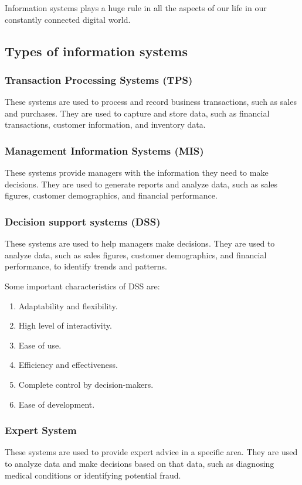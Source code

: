 \documentclass[twocolumn, 12pt, a4paper]{article}
\begin{document}
Information systems plays a huge rule in all the aspects of our life in our
constantly connected digital world.

\subsection{Types of information systems}
\subsubsection{Transaction Processing Systems (TPS)}
These systems are used to process and record business transactions, such as
sales and purchases. They are used to capture and store data, such as financial
transactions, customer information, and inventory data.

\subsubsection{Management Information Systems (MIS)}
These systems provide managers with the information they need to make
decisions. They are used to generate reports and analyze data, such as sales
figures, customer demographics, and financial performance.

\subsubsection{Decision support systems (DSS)}
These systems are used to help managers make decisions. They are used to
analyze data, such as sales figures, customer demographics, and financial
performance, to identify trends and patterns.

Some important characteristics of DSS are:
\begin{enumerate}
  \item Adaptability and flexibility.
  \item High level of interactivity.
  \item Ease of use.
  \item Efficiency and effectiveness.
  \item Complete control by decision-makers.
  \item Ease of development.
\end{enumerate}

\subsubsection{Expert System}
These systems are used to provide expert advice in a specific area. They are
used to analyze data and make decisions based on that data, such as diagnosing 
medical conditions or identifying potential fraud.
\end{document}
